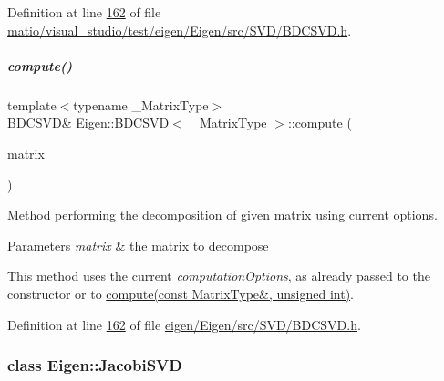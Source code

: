 Definition at line \hyperlink{matio_2visual__studio_2test_2eigen_2_eigen_2src_2_s_v_d_2_b_d_c_s_v_d_8h_source_l00162}{162} of file \hyperlink{matio_2visual__studio_2test_2eigen_2_eigen_2src_2_s_v_d_2_b_d_c_s_v_d_8h_source}{matio/visual\+\_\+studio/test/eigen/\+Eigen/src/\+S\+V\+D/\+B\+D\+C\+S\+V\+D.\+h}.

\mbox{\label{group___s_v_d___module_acf27f41ed044d74ea8e8cbaf17ffdb04}} 
\subparagraph{\texorpdfstring{compute()}{compute()}\hspace{0.1cm}{\footnotesize\ttfamily [4/4]}}
{\footnotesize\ttfamily template$<$typename \+\_\+\+Matrix\+Type$>$ \\
\hyperlink{group___s_v_d___module_class_eigen_1_1_b_d_c_s_v_d}{B\+D\+C\+S\+VD}\& \hyperlink{group___s_v_d___module_class_eigen_1_1_b_d_c_s_v_d}{Eigen\+::\+B\+D\+C\+S\+VD}$<$ \+\_\+\+Matrix\+Type $>$\+::compute (\begin{DoxyParamCaption}\item[{const Matrix\+Type \&}]{matrix }\end{DoxyParamCaption})\hspace{0.3cm}{\ttfamily [inline]}}



Method performing the decomposition of given matrix using current options. 


\begin{DoxyParams}{Parameters}
{\em matrix} & the matrix to decompose\\
\hline
\end{DoxyParams}
This method uses the current {\itshape computation\+Options}, as already passed to the constructor or to \hyperlink{group___s_v_d___module_a52e3c627775010775c64d16a00cdb770}{compute(const Matrix\+Type\&, unsigned int)}. 

Definition at line \hyperlink{eigen_2_eigen_2src_2_s_v_d_2_b_d_c_s_v_d_8h_source_l00162}{162} of file \hyperlink{eigen_2_eigen_2src_2_s_v_d_2_b_d_c_s_v_d_8h_source}{eigen/\+Eigen/src/\+S\+V\+D/\+B\+D\+C\+S\+V\+D.\+h}.

\label{class_eigen_1_1_jacobi_s_v_d}
\subsubsection{class Eigen\+:\+:Jacobi\+S\+VD}
